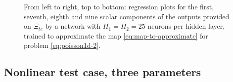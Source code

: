 \documentclass[12pt, a4paper, twoside, openright]{report}
\numberwithin{equation}{chapter}
\theoremstyle{theorem}
\theoremstyle{definition}
\theoremstyle{remark}
\theoremstyle{proposition}
\numberwithin{figure}{chapter}
\begin{document}
\begin{figure}[t!]
			
			\caption{From left to right, top to bottom: regression plots for the first, seventh, eighth and nine scalar components of the outputs provided on $\Xi_{te}$ by a network with $H_1 = H_2 = 25$ neurons per hidden layer, trained to approximate the map \eqref{eq:map-to-approximate} for problem \eqref{eq:poisson1d-2}.}
			\label{fig:poisson1d-2-fig3}
		\end{figure}
			
	\subsection{Nonlinear test case, three parameters}
	\label{section:poisson1d-3}
	
\end{document}
